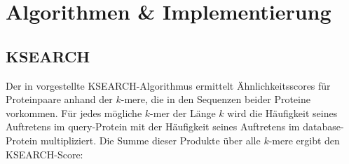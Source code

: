\documentclass{article}
\begin{document}
\section{Algorithmen \& Implementierung}

\subsection{KSEARCH}
\label{ksearch}

Der in \cite{Holm} vorgestellte KSEARCH-Algorithmus ermittelt Ähnlichkeitsscores für Proteinpaare anhand der $k$-mere, die in den Sequenzen beider Proteine vorkommen. Für jedes mögliche $k$-mer der Länge $k$ wird die Häufigkeit seines Auftretens im query-Protein mit der Häufigkeit seines Auftretens im database-Protein multipliziert. Die Summe dieser Produkte über alle $k$-mere ergibt den KSEARCH-Score:
\end{document}
